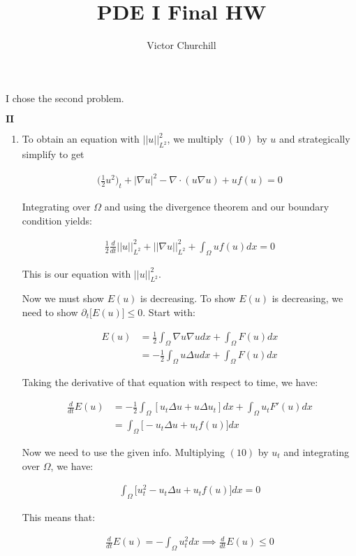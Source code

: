 \documentclass[12pt, letterpaper]{article}
\title{\vspace{-3ex}
{\bf \Large PDE I Final HW} \vspace{-1ex}}
\author{Victor Churchill}
\date{}
\begin{document}
\maketitle

I chose the second problem.

$\mathbf{II}$
\begin{enumerate}
\item 

To obtain an equation with $||u||^2_{L^2}$, we multiply $(10)$ by $u$ and strategically simplify to get

\begin{align}
\big(\frac{1}{2}u^2\big)_t+|\nabla u|^2-\nabla \cdot(u\nabla u)+uf(u)=0
\end{align}

Integrating over $\Omega$ and using the divergence theorem and our boundary condition yields:

\begin{align}
\frac{1}{2}\frac{d}{dt}||u||_{L^2}^2+||\nabla u||^2_{L^2}+\int_\Omega u f(u)dx=0
\end{align}

This is our equation with $||u||^2_{L^2}$.

Now we must show $E(u)$ is decreasing. To show $E(u)$ is decreasing, we need to show $\partial_t\big[E(u)\big]\le 0$. Start with:

\begin{align}
E(u)&=\frac{1}{2}\int_\Omega\nabla u \nabla u dx+ \int_\Omega F(u)dx\\
&=-\frac{1}{2}\int_\Omega u\Delta u dx + \int_\Omega F(u)dx
\end{align}

Taking the derivative of that equation with respect to time, we have:

\begin{align}
\frac{d}{dt}E(u)&=-\frac{1}{2}\int_\Omega [u_t\Delta u + u\Delta u_t]dx +\int_\Omega u_tF'(u)dx\\
&=\int_\Omega \big[-u_t\Delta u+ u_tf(u)\big]dx
\end{align}

Now we need to use the given info. Multiplying $(10)$ by $u_t$ and integrating over $\Omega$, we have:

\begin{align}
\int_\Omega\big[u_t^2-u_t\Delta u +u_tf(u)\big]dx=0
\end{align}

This means that:

\begin{align}
\frac{d}{dt}E(u)=-\int_\Omega u_t^2dx \implies \frac{d}{dt}E(u)\le 0
\end{align}


\end{enumerate}
\end{document}
